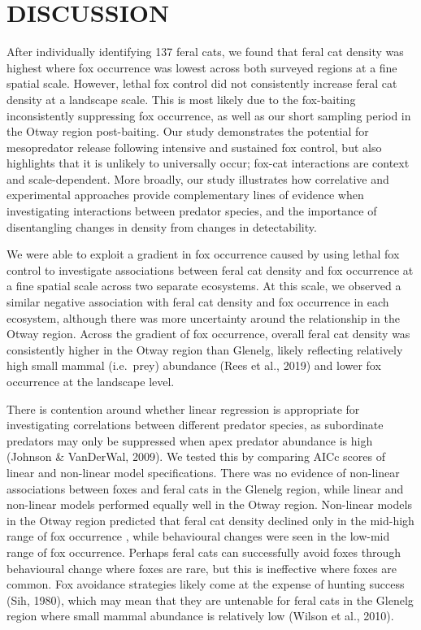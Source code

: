\documentclass[]{elsarticle} %
\begin{document}
\newpage

\hypertarget{discussion}{%
\section{DISCUSSION}\label{discussion}}

After individually identifying 137 feral cats, we found that feral cat density was highest where fox occurrence was lowest across both surveyed regions at a fine spatial scale. However, lethal fox control did not consistently increase feral cat density at a landscape scale. This is most likely due to the fox-baiting inconsistently suppressing fox occurrence, as well as our short sampling period in the Otway region post-baiting. Our study demonstrates the potential for mesopredator release following intensive and sustained fox control, but also highlights that it is unlikely to universally occur; fox-cat interactions are context and scale-dependent. More broadly, our study illustrates how correlative and experimental approaches provide complementary lines of evidence when investigating interactions between predator species, and the importance of disentangling changes in density from changes in detectability.

We were able to exploit a gradient in fox occurrence caused by using lethal fox control to investigate associations between feral cat density and fox occurrence at a fine spatial scale across two separate ecosystems. At this scale, we observed a similar negative association with feral cat density and fox occurrence in each ecosystem, although there was more uncertainty around the relationship in the Otway region. Across the gradient of fox occurrence, overall feral cat density was consistently higher in the Otway region than Glenelg, likely reflecting relatively high small mammal (i.e.~prey) abundance (Rees et al., 2019) and lower fox occurrence at the landscape level.

There is contention around whether linear regression is appropriate for investigating correlations between different predator species, as subordinate predators may only be suppressed when apex predator abundance is high (Johnson \& VanDerWal, 2009). We tested this by comparing AICc scores of linear and non-linear model specifications. There was no evidence of non-linear associations between foxes and feral cats in the Glenelg region, while linear and non-linear models performed equally well in the Otway region. Non-linear models in the Otway region predicted that feral cat density declined only in the mid-high range of fox occurrence , while behavioural changes were seen in the low-mid range of fox occurrence. Perhaps feral cats can successfully avoid foxes through behavioural change where foxes are rare, but this is ineffective where foxes are common. Fox avoidance strategies likely come at the expense of hunting success (Sih, 1980), which may mean that they are untenable for feral cats in the Glenelg region where small mammal abundance is relatively low (Wilson et al., 2010).
\end{document}
